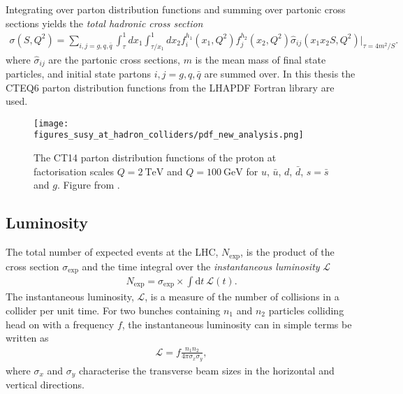 \documentclass[twoside,english]{uiofysmaster}
\begin{document}
{Integrating over parton distribution functions and summing over partonic cross sections yields the \textit{total hadronic cross section}
\begin{align}
\sigma(S, Q^2) = \sum_{i,j=g, q, \bar{q}} \int_{\tau}^1dx_1 \int_{\tau/x_1}^1 dx_2 f_i^{h_1} (x_1, Q^2) f_j^{h_2}(x_2, Q^2) \hat{\sigma}_{ij} (x_1x_2S, Q^2)\Big|_{\tau=4m^2/S}.
\end{align}
where $\hat{\sigma}_{ij}$ are the partonic cross sections, $m$ is the mean mass of final state particles, and initial state partons $i,j=g,q, \bar{q}$ are summed over.  In this thesis the CTEQ6 parton distribution functions from the LHAPDF Fortran library \cite{Nadolsky:2008zw} are used. 

\begin{figure}
\centering
\texttt{[image: figures\_susy\_at\_hadron\_colliders/pdf\_new\_analysis.png]}
\caption[Parton distribution functions for the proton]{The CT14 parton distribution functions of the proton at factorisation scales $Q=2~\mathrm{TeV}$ and $Q=100~\mathrm{GeV}$ for $u$, $\bar{u}$, $d$, $\bar{d}$, $s=\bar{s}$ and $g$.  Figure from \cite{Dulat:2015mca}.}
\label{Fig:: susy hadron : PDFs}
\end{figure}




\subsection{Luminosity}

The total number of expected events at the LHC, $N_{\mathrm{exp}}$, is the product of the cross section $\sigma_{\mathrm{exp}}$ and the time integral over the \textit{instantaneous luminosity} $\mathscr{L}$
\begin{align}\label{Eq:: susy hadron : Luminosity}
N_{\mathrm{exp}} = \sigma_{\mathrm{exp}} \times \int \mathrm{d}t~ \mathscr{L}(t).
\end{align}
The instantaneous luminosity, $\mathscr{L}$, is a measure of the number of collisions in a collider per unit time. For two bunches containing $n_1$ and $n_2$ particles colliding head on with a frequency $f$, the instantaneous luminosity can in simple terms be written as
\begin{align}
\mathscr{L} = f \frac{n_1 n_2}{4 \pi \sigma_x \sigma_y},
\end{align}
where $\sigma_x$ and $\sigma_y$ characterise the transverse beam sizes in the horizontal and vertical directions.

}
\end{document}
